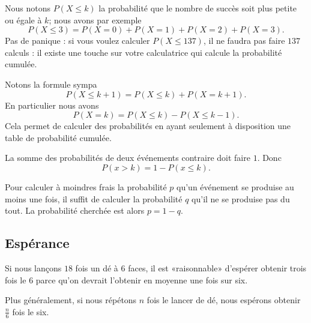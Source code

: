 Nous notons \( P(X\leq k)\) la probabilité que le nombre de succès soit plus petite ou égale à \( k\); nous avons par exemple
\begin{equation}
    P(X\leq 3)=P(X=0)+P(X=1)+P(X=2)+P(X=3).
\end{equation}
Pas de panique : si vous voulez calculer \( P(X\leq 137)\), il ne faudra pas faire \( 137\) calculs : il existe une touche sur votre calculatrice qui calcule la probabilité cumulée.

Notons la formule sympa
\begin{equation}
    P(X\leq k+1)=P(X\leq k)+P(X=k+1).
\end{equation}
En particulier nous avons
\begin{equation}
    P(X=k)=P(X\leq k)-P(X\leq k-1).
\end{equation}
Cela permet de calculer des probabilités en ayant seulement à disposition une table de probabilité cumulée.

\begin{Aretenir}
     La somme des probabilités de deux événements contraire doit faire \( 1\). Donc
    \begin{equation}
        P(x>k)=1-P(x\leq k).
    \end{equation}
\end{Aretenir}

\begin{example}
    Pour calculer à moindres frais la probabilité \( p\) qu'un événement se produise au moins une fois, il suffit de calculer la probabilité \( q\) qu'il ne se produise pas du tout. La probabilité cherchée est alors \( p=1-q\).
\end{example}

\subsection{Espérance}

\begin{example}
    Si nous lançons \( 18\) fois un dé à \( 6\) faces, il est «raisonnable» d'espérer obtenir trois fois le \( 6\) parce qu'on devrait l'obtenir en moyenne une fois sur six.
\end{example}
Plus généralement, si nous répétons \( n\) fois le lancer de dé, nous espérons obtenir \( \frac{ n }{ 6 }\) fois le six.

